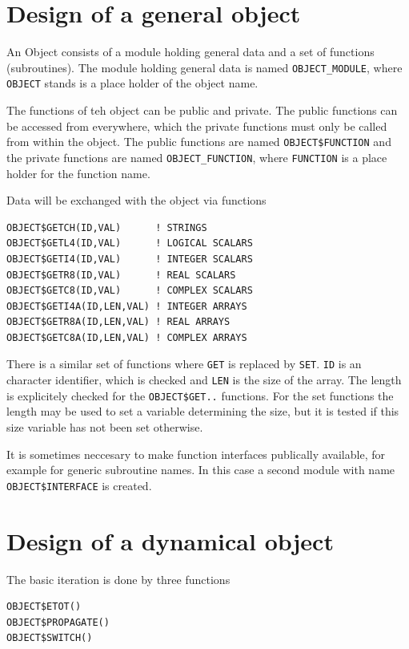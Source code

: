 \documentclass[a4paper,10pt]{report}
\begin{document}
%
\section{Design of a general object}
An Object consists of a module holding general data and a set of
functions (subroutines).  The module holding general data is named
\texttt{OBJECT\_MODULE}, where \texttt{OBJECT} stands is a place
holder of the object name.

The functions of teh object can be public and private. The public
functions can be accessed from everywhere, which the private functions
must only be called from within the object. The public functions are
named \texttt{OBJECT\$FUNCTION} and the private functions are named
\texttt{OBJECT\_FUNCTION}, where \texttt{FUNCTION} is a place holder
for the function name.

Data will be exchanged with the object via functions 
\begin{verbatim}
OBJECT$GETCH(ID,VAL)      ! STRINGS
OBJECT$GETL4(ID,VAL)      ! LOGICAL SCALARS
OBJECT$GETI4(ID,VAL)      ! INTEGER SCALARS
OBJECT$GETR8(ID,VAL)      ! REAL SCALARS
OBJECT$GETC8(ID,VAL)      ! COMPLEX SCALARS
OBJECT$GETI4A(ID,LEN,VAL) ! INTEGER ARRAYS
OBJECT$GETR8A(ID,LEN,VAL) ! REAL ARRAYS
OBJECT$GETC8A(ID,LEN,VAL) ! COMPLEX ARRAYS
\end{verbatim}
There is a similar set of functions where \texttt{GET} is replaced by
\texttt{SET}.  \texttt{ID} is an character identifier, which is checked
and \texttt{LEN} is the size of the array. The length is explicitely
checked for the \texttt{OBJECT\$GET..} functions. For the set
functions the length may be used to set a variable determining the
size, but it is tested if this size variable has not been set
otherwise.

It is sometimes neccesary to make function interfaces publically
available, for example for generic subroutine names. In this case a
second module with name \texttt{OBJECT\$INTERFACE} is created.
%
\section{Design of a dynamical object}
The basic iteration is done by three functions
\begin{verbatim}
OBJECT$ETOT()
OBJECT$PROPAGATE()
OBJECT$SWITCH()
\end{verbatim}
\end{document}
